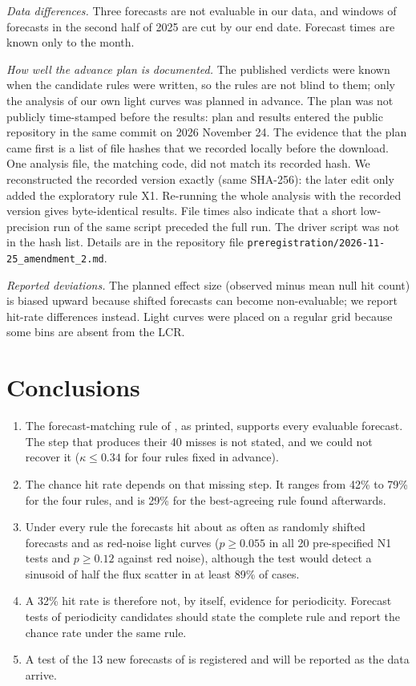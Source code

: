 \documentclass[twocolumn]{aastex631}
\newcommand{\LCR}{LCR}
\begin{document}
\textit{Data differences.} Three forecasts are not evaluable in our data, and windows of forecasts in the second half of 2025 are cut by our end date. Forecast times are known only to the month.

\textit{How well the advance plan is documented.} The published verdicts were known when the candidate rules were written, so the rules are not blind to them; only the analysis of our own light curves was planned in advance. The plan was not publicly time-stamped before the results: plan and results entered the public repository in the same commit on 2026 November 24. The evidence that the plan came first is a list of file hashes that we recorded locally before the download. One analysis file, the matching code, did not match its recorded hash. We reconstructed the recorded version exactly (same SHA-256): the later edit only added the exploratory rule X1. Re-running the whole analysis with the recorded version gives byte-identical results. File times also indicate that a short low-precision run of the same script preceded the full run. The driver script was not in the hash list. Details are in the repository file \texttt{preregistration/2026-11-25\_amendment\_2.md}.

\textit{Reported deviations.} The planned effect size (observed minus mean null hit count) is biased upward because shifted forecasts can become non-evaluable; we report hit-rate differences instead. Light curves were placed on a regular grid because some bins are absent from the \LCR.

\section{Conclusions} \label{sec:conclusions}

\begin{enumerate}
\item The forecast-matching rule of \citet{penil26}, as printed, supports every evaluable forecast. The step that produces their 40 misses is not stated, and we could not recover it ($\kappa\le0.34$ for four rules fixed in advance).
\item The chance hit rate depends on that missing step. It ranges from 42\% to 79\% for the four rules, and is 29\% for the best-agreeing rule found afterwards.
\item Under every rule the forecasts hit about as often as randomly shifted forecasts and as red-noise light curves ($p\ge0.055$ in all 20 pre-specified N1 tests and $p\ge0.12$ against red noise), although the test would detect a sinusoid of half the flux scatter in at least 89\% of cases.
\item A 32\% hit rate is therefore not, by itself, evidence for periodicity. Forecast tests of periodicity candidates should state the complete rule and report the chance rate under the same rule.
\item A test of the 13 new forecasts of \citet{penil26} is registered and will be reported as the data arrive.
\end{enumerate}
\end{document}
